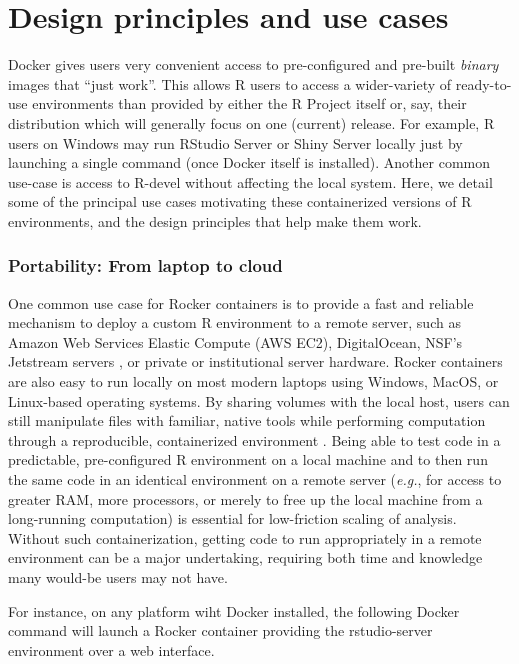 \section{Design principles and use
cases}\label{design-principles-and-use-cases}

Docker gives users very convenient access to pre-configured and
pre-built \emph{binary} images that ``just work''. This allows R users
to access a wider-variety of ready-to-use environments than provided by
either the R Project itself or, say, their distribution which will
generally focus on one (current) release. For example, R users on
Windows may run RStudio\textsuperscript{\textregistered} Server or
Shiny\textsuperscript{\textregistered} Server locally just by launching
a single command (once Docker itself is installed). Another common
use-case is access to R-devel without affecting the local system. Here,
we detail some of the principal use cases motivating these containerized
versions of R environments, and the design principles that help make
them work.

\subsubsection{Portability: From laptop to
cloud}\label{portability-from-laptop-to-cloud}

One common use case for Rocker containers is to provide a fast and
reliable mechanism to deploy a custom R environment to a remote server,
such as Amazon Web Services Elastic Compute (AWS EC2), DigitalOcean,
NSF's Jetstream servers \citep{jetstream}, or private or institutional
server hardware. Rocker containers are also easy to run locally on most
modern laptops using Windows, MacOS, or Linux-based operating systems.
By sharing volumes with the local host, users can still manipulate files
with familiar, native tools while performing computation through a
reproducible, containerized environment \citep{Boettiger2015}. Being
able to test code in a predictable, pre-configured R environment on a
local machine and to then run the same code in an identical environment
on a remote server (\emph{e.g.}, for access to greater RAM, more
processors, or merely to free up the local machine from a long-running
computation) is essential for low-friction scaling of analysis. Without
such containerization, getting code to run appropriately in a remote
environment can be a major undertaking, requiring both time and
knowledge many would-be users may not have.

For instance, on any platform wiht Docker installed, the following
Docker command will launch a Rocker container providing the
rstudio-server environment over a web interface.

